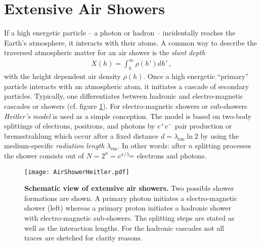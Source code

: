 \section{Extensive Air Showers}

If a high energetic particle -- a photon or hadron -- incidentally reaches the Earth's atmosphere, it interacts with their atoms. A common way to describe the traversed atmospheric matter for an air shower is the \textit{slant depth}
\begin{align}
X(h) = \int_{h}^{\infty}\rho(h')dh'\,,
\end{align}
with the height dependent air density $\rho(h)$. Once a high energetic \enquote{primary} particle interacts with an atmospheric atom, it initiates a cascade of secondary particles. Typically, one differentiates between hadronic and electro-magnetic cascades or showers (cf. figure \ref{airshowers:cascades}). For electro-magnetic showers or sub-showers \textit{Heitler's model} is used as a simple conception. The model is based on two-body splittings of electrons, positrons, and photons by $e^+ e^-$ pair production or bremsstrahlung which occur after a fixed distance $d=\lambda_\text{em}\ln{2}$ by using the medium-specific \textit{radiation length} $\lambda_\text{em}$. In other words: after $n$ splitting processes the shower consists out of $N = 2^n = e^{x/\lambda_\text{em}}$ electrons and photons.

\begin{figure}[h]
	\texttt{[image: AirShowerHeitler.pdf]}
	\caption[Schematic view of extensive air showers]{\textbf{Schematic view of extensive air showers.} \cite{famous:niggemann} Two possible shower formations are shown. A primary photon initiates a electro-magnetic shower (left) whereas a primary proton initiates a hadronic shower with electro-magnetic sub-showers. The splitting steps are stated as well as the interaction lengths. For the hadronic cascades not all traces are sketched for clarity reasons.}	
	\label{airshowers:cascades}
\end{figure}

